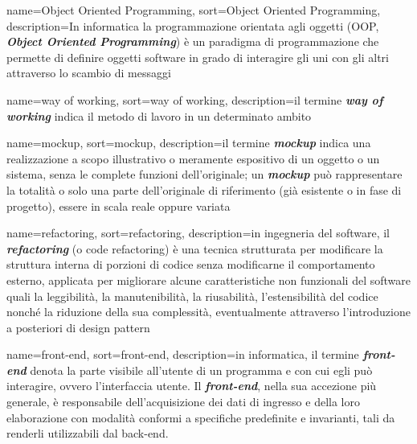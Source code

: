 {
    name=Object Oriented Programming,
    sort=Object Oriented Programming,
    description={In informatica la programmazione orientata agli oggetti (OOP, \textit{\textbf{Object Oriented Programming}}) è un paradigma di programmazione che permette di definire oggetti software in grado di interagire gli uni con gli altri attraverso lo scambio di messaggi}
}

{
    name=way of working,
    sort=way of working,
    description={il termine \textbf{\textit{way of working}} indica il metodo di lavoro in un determinato ambito}
}

{
    name=mockup,
    sort=mockup,
    description={il termine \textit{\textbf{mockup}} indica una realizzazione a scopo illustrativo o meramente espositivo di un oggetto o un sistema, senza le complete funzioni dell'originale; un \textit{\textbf{mockup}} può rappresentare la totalità o solo una parte dell'originale di riferimento (già esistente o in fase di progetto), essere in scala reale oppure variata}
}

{
    name=refactoring,
    sort=refactoring,
    description={in ingegneria del software, il \textit{\textbf{refactoring}} (o code refactoring) è una tecnica strutturata per modificare la struttura interna di porzioni di codice senza modificarne il comportamento esterno, applicata per migliorare alcune caratteristiche non funzionali del software quali la leggibilità, la manutenibilità, la riusabilità, l'estensibilità del codice nonché la riduzione della sua complessità, eventualmente attraverso l'introduzione a posteriori di design pattern}
}

{
    name=front-end,
    sort=front-end,
    description={in informatica, il termine \textit{\textbf{front-end}} denota la parte visibile all'utente di un programma e con cui egli può interagire, ovvero l'interfaccia utente. Il \textbf{\textit{front-end}}, nella sua accezione più generale, è responsabile dell'acquisizione dei dati di ingresso e della loro elaborazione con modalità conformi a specifiche predefinite e invarianti, tali da renderli utilizzabili dal back-end.}
}
